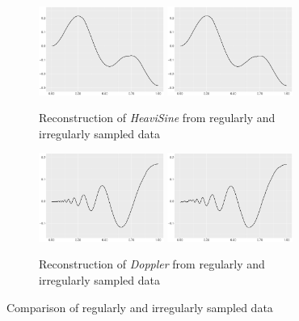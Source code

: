 \begin{figure}[!h]
\begin{subfigure}{\textwidth}
    \end{subfigure}
    \begin{subfigure}{\textwidth}
    \centering
    \includegraphics[width=0.45\textwidth]{Chapters/02TractorSplineTheory/plot/ggplot/ggheavisinreg.pdf}
    \includegraphics[width=0.45\textwidth]{Chapters/02TractorSplineTheory/plot/ggplot/ggheavisinire.pdf}
    \caption{Reconstruction of \textit{HeaviSine} from regularly and irregularly sampled data}
    \end{subfigure}
    \begin{subfigure}{\textwidth}
    \centering
    \includegraphics[width=0.45\textwidth]{Chapters/02TractorSplineTheory/plot/ggplot/ggdopplerreg.pdf}
    \includegraphics[width=0.45\textwidth]{Chapters/02TractorSplineTheory/plot/ggplot/ggdopplerire.pdf}
    \caption{Reconstruction of \textit{Doppler} from regularly and irregularly sampled data}
    \end{subfigure}
 \caption{Comparison of regularly and irregularly sampled data}\label{irregularFigure}
 \end{figure}




